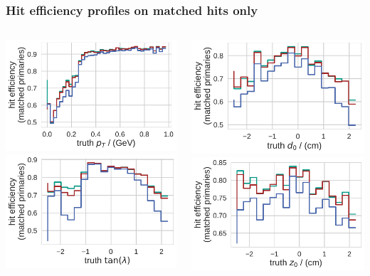 \documentclass[18pt, aspectratio=169]{beamer}
\begin{document}
\begin{frame}
  \frametitle{Hit efficiency profiles on matched hits only}
  \begin{columns}
    \begin{column}{.5\textwidth}
      \centering
      \includegraphics[width=.65\textwidth]{figures/hiteff_on_matched_by_pt_truth_fullreco.pdf}\\
      \includegraphics[width=.65\textwidth]{figures/hiteff_on_matched_by_tan_lambda_truth_fullreco.pdf}
    \end{column}    
    \begin{column}{.5\textwidth}
      \centering
      \includegraphics[width=.65\textwidth]{figures/hiteff_on_matched_by_d0_truth_fullreco.pdf}\\
      \includegraphics[width=.65\textwidth]{figures/hiteff_on_matched_by_z0_truth_fullreco.pdf}

\end{column}
\end{columns}
\end{frame}
\end{document}
